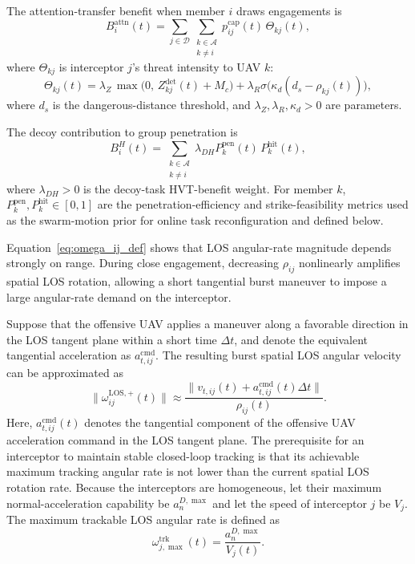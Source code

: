 \documentclass{cja}
\begin{document}
The attention-transfer benefit when member $i$ draws engagements is
\begin{equation}
B_i^{\mathrm{attn}}(t)
=
\sum_{j\in\mathcal{D}}
\sum_{\substack{k\in\mathcal{A}\\k\neq i}}
p_{ij}^{\mathrm{cap}}(t)\,\Theta_{kj}(t),
\end{equation}
where $\Theta_{kj}$ is interceptor $j$'s threat intensity to UAV $k$:
\begin{equation}
\Theta_{kj}(t)
=
\lambda_Z\,\max\bigl(0,\, Z_{kj}^{\mathrm{det}}(t)+M_c\bigr)
+
\lambda_R \sigma\!\bigl(\kappa_d(d_s-\rho_{kj}(t))\bigr),
\end{equation}
where $d_s$ is the dangerous-distance threshold, and $\lambda_Z,\lambda_R,\kappa_d>0$ are parameters.

The decoy contribution to group penetration is
\begin{equation}
B_i^{H}(t)
=
\sum_{\substack{k\in\mathcal{A}\\k\neq i}}
\lambda_{DH} P_k^{\mathrm{pen}}(t)\,P_k^{\mathrm{hit}}(t),
\end{equation}
where $\lambda_{DH}>0$ is the decoy-task HVT-benefit weight. For member $k$, $P_k^{\mathrm{pen}},P_k^{\mathrm{hit}}\in[0,1]$ are the penetration-efficiency and strike-feasibility metrics used as the swarm-motion prior for online task reconfiguration and defined below.

Equation~\eqref{eq:omega_ij_def} shows that LOS angular-rate magnitude depends strongly on range. During close engagement, decreasing $\rho_{ij}$ nonlinearly amplifies spatial LOS rotation, allowing a short tangential burst maneuver to impose a large angular-rate demand on the interceptor.

Suppose that the offensive UAV applies a maneuver along a favorable direction in the LOS tangent plane within a short time $\Delta t$, and denote the equivalent tangential acceleration as $a_{t,ij}^{\mathrm{cmd}}$. The resulting burst spatial LOS angular velocity can be approximated as
\begin{equation}
\|\omega_{ij}^{\mathrm{LOS},+}(t)\|
\approx
\frac{\|v_{t,ij}(t)+a_{t,ij}^{\mathrm{cmd}}(t)\Delta t\|}{\rho_{ij}(t)}.
\end{equation}
Here, $a_{t,ij}^{\mathrm{cmd}}(t)$ denotes the tangential component of the offensive UAV acceleration command in the LOS tangent plane.
The prerequisite for an interceptor to maintain stable closed-loop tracking is that its achievable maximum tracking angular rate is not lower than the current spatial LOS rotation rate. Because the interceptors are homogeneous, let their maximum normal-acceleration capability be $a_n^{D,\max}$ and let the speed of interceptor $j$ be $V_j$. The maximum trackable LOS angular rate is defined as
\begin{equation}
\omega_{j,\max}^{\mathrm{trk}}(t)
=
\frac{a_n^{D,\max}}{V_j(t)}.
\end{equation}
\end{document}
